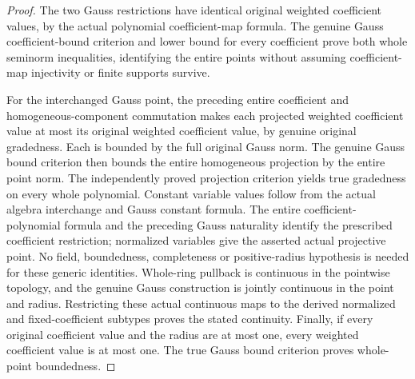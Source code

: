\begin{proof}
The two Gauss restrictions have identical original weighted coefficient
values, by the actual polynomial coefficient-map formula. The genuine
Gauss coefficient-bound criterion and lower bound for every coefficient
prove both whole seminorm inequalities, identifying the entire points
without assuming coefficient-map injectivity or finite supports survive.

For the interchanged Gauss point, the preceding entire coefficient and
homogeneous-component commutation makes each projected weighted coefficient
value at most its original weighted coefficient value, by genuine
original gradedness. Each is bounded by the full original Gauss norm.
The genuine Gauss bound criterion then bounds the entire homogeneous
projection by the entire point norm. The independently proved projection
criterion yields true gradedness on every whole polynomial. Constant
variable values follow from the actual algebra interchange and Gauss
constant formula. The entire coefficient-polynomial formula and the
preceding Gauss naturality identify the prescribed coefficient
restriction; normalized variables give the asserted actual projective
point. No field, boundedness, completeness or positive-radius hypothesis
is needed for these generic identities. Whole-ring pullback is continuous
in the pointwise topology, and the genuine Gauss construction is jointly
continuous in the point and radius. Restricting these actual continuous
maps to the derived normalized and fixed-coefficient subtypes proves
the stated continuity. Finally, if every original coefficient value
and the radius are at most one, every weighted coefficient value is
at most one. The true Gauss bound criterion proves whole-point boundedness.
\end{proof}


